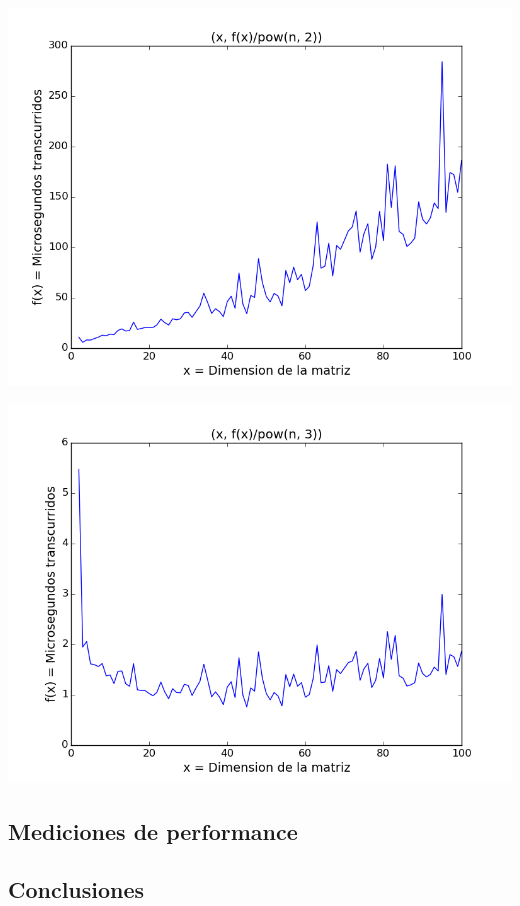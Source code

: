 \begin{center}
\includegraphics[scale=0.54]{images/4potenciasobrecuadrado}
\end{center}


\begin{center}
\includegraphics[scale=0.54]{images/4potenciasobrecubo}
\end{center}


\subsection{Mediciones de performance} \label{ej_3:performance}

\subsection{Conclusiones} \label{ej_3:conclusiones}

